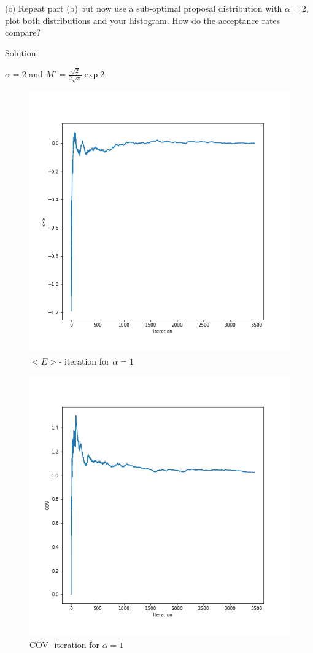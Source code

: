 \documentclass{article}
\begin{document}
\newpage
(c) Repeat part (b) but now use a sub-optimal proposal distribution with $\alpha=2$, plot both distributions and your histogram. How do the acceptance rates compare?

Solution:

$\alpha = 2$ and 
$M' = \frac{\sqrt{2}}{2\sqrt{\pi}} \exp{2}$
    
\begin{figure}[h!]
\centering
\includegraphics[scale=0.4]{h4p1c1.png}
\caption{$<E>$- iteration for $\alpha = 1$}
\end{figure}

\begin{figure}[h!]
\centering
\includegraphics[scale=0.4]{h4p1c2.png}
\caption{COV- iteration for $\alpha = 1$}
\end{figure}
\end{document}
